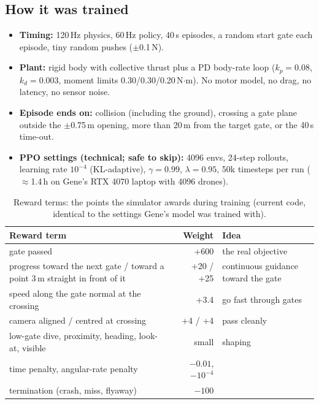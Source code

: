 \documentclass[10pt,a4paper]{article}
\begin{document}
\subsection{How it was trained}
\begin{itemize}
\item \textbf{Timing:} 120\,Hz physics, 60\,Hz policy, 40\,s episodes, a random start gate each episode, tiny random pushes ($\pm$0.1\,N).
\item \textbf{Plant:} rigid body with collective thrust plus a PD body-rate loop ($k_p{=}0.08$, $k_d{=}0.003$, moment limits 0.30/0.30/0.20\,N$\cdot$m). No motor model, no drag, no latency, no sensor noise.
\item \textbf{Episode ends on:} collision (including the ground), crossing a gate plane outside the $\pm$0.75\,m opening, more than 20\,m from the target gate, or the 40\,s time-out.
\item \textbf{PPO settings (technical; safe to skip):} 4096 envs, 24-step rollouts, learning rate $10^{-4}$ (KL-adaptive), $\gamma{=}0.99$, $\lambda{=}0.95$, 50k timesteps per run ($\approx$1.4\,h on Gene's RTX 4070 laptop with 4096 drones).
\end{itemize}

\begin{table}[H]\centering\small
\begin{tabularx}{\linewidth}{@{}XrX@{}}
\toprule
Reward term & Weight & Idea \\
\midrule
gate passed & +600 & the real objective \\
progress toward the next gate / toward a point 3\,m straight in front of it & +20 / +25 & continuous guidance toward the gate \\
speed along the gate normal at the crossing & +3.4 & go fast through gates \\
camera aligned / centred at crossing & +4 / +4 & pass cleanly \\
low-gate dive, proximity, heading, look-at, visible & small & shaping \\
time penalty, angular-rate penalty & $-0.01$, $-10^{-4}$ & \\
termination (crash, miss, flyaway) & $-100$ & \\
\bottomrule
\end{tabularx}
\caption{Reward terms: the points the simulator awards during training (current code, identical to the settings Gene's model was trained with).}
\end{table}
\end{document}
